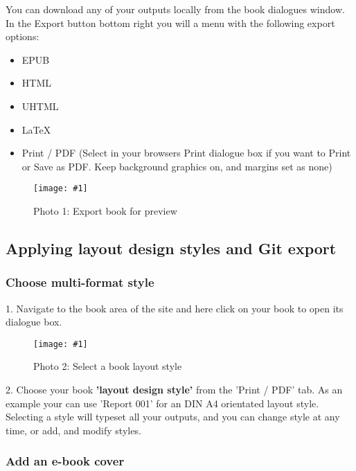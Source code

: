 \documentclass{article}
\newlength{\imgwidth}
\newcommand\scaledgraphics[2]{%
                
\settowidth{\imgwidth}{\texttt{[image: \#1]}}%
                
\setlength{\imgwidth}{\minof{\imgwidth}{#2\textwidth}}%
                
\texttt{[image: \#1]}%
                
}
\begin{document}
You can download any of your outputs locally from the book dialogues window. In the Export button bottom right you will a menu with the following export options:

\begin{itemize}
\item EPUB


\item HTML


\item UHTML


\item LaTeX


\item Print / PDF (Select in your browsers Print dialogue box if you want to Print or Save as PDF. Keep background graphics on, and margins set as none)


\end{itemize}
\begin{figure}
\scaledgraphics{81aa11b0-e706-4d38-9d60-97b77fdfbaf9.png}{1}
\caption*{Photo 1: Export book for preview}\label{F46160661}
\end{figure}


\subsection{Applying layout design styles and Git export}\label{H2238943}



\subsubsection{Choose multi-format style}\label{H4518313}



1. Navigate to the book area of the site and here click on your book to open its dialogue box.

\begin{figure}
\scaledgraphics{0a969aee-3f29-4e82-a3c7-1bb4f783ac91.png}{1}
\caption*{Photo 2: Select a book layout style}\label{F40472071}
\end{figure}


2. Choose your book \textbf{'layout design style' }from the 'Print / PDF' tab. As an example your can use 'Report 001' for an DIN A4 orientated layout style. Selecting a style will typeset all your outputs, and you can change style at any time, or add, and modify styles.


\subsubsection{Add an e-book cover}\label{H2562599}
\end{document}
